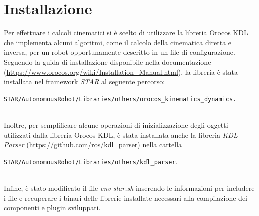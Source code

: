 \section{Installazione}
Per effettuare i calcoli cinematici si è scelto di utilizzare la libreria Orocos KDL che implementa alcuni algoritmi, come il calcolo della cinematica diretta e inversa, per un robot opportunamente descritto in un file di configurazione. Seguendo la guida di installazione disponibile nella documentazione (\url{https://www.orocos.org/wiki/Installation_Manual.html}), la libreria è stata installata nel framework \textit{STAR} al seguente percorso: \\ 
\centerline{\texttt{STAR/AutonomousRobot/Libraries/others/orocos\_kinematics\_dynamics.}} \\
Inoltre, per semplificare alcune operazioni di inizializzazione degli oggetti utilizzati dalla libreria Orocos KDL, è stata installata anche la libreria \textit{KDL Parser} (\url{https://github.com/ros/kdl_parser}) nella cartella \\ \centerline{\texttt{STAR/AutonomousRobot/Libraries/others/kdl\_parser}.} \\ Infine, è stato modificato il file \textit{env-star.sh} inserendo le informazioni per includere i file e recuperare i binari delle librerie installate necessari alla compilazione dei componenti e plugin sviluppati.

